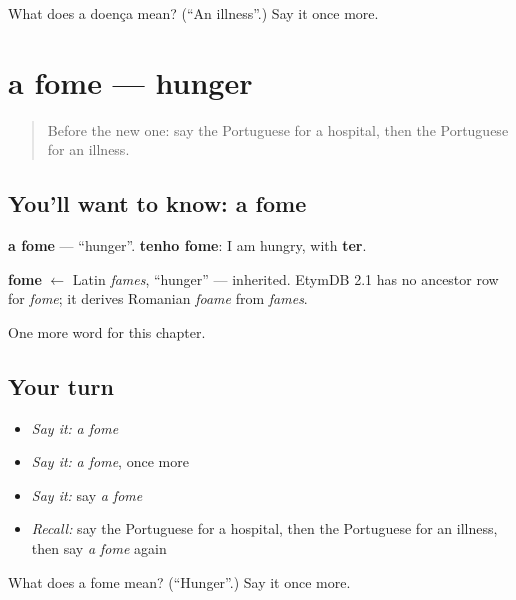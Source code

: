 \begin{tcolorbox}[breakable,colback=teal!4,colframe=teal!35!black,title={Before you move on}]
What does a doença mean? (\textquotedblleft{}An illness\textquotedblright{}.) Say it once more.
\end{tcolorbox}
\section[a fome]{a fome — hunger}

\label{lesson:PT-C35-fome}



\begin{quote}
Before the new one: say the Portuguese for a hospital, then the Portuguese for an illness.
\end{quote}

\subsection*{You'll want to know: a fome}
\textbf{a fome} — \textquotedblleft{}hunger\textquotedblright{}. \textbf{tenho fome}: I am hungry, with \textbf{ter}.

\begin{cousinweb}
\textbf{fome} $\leftarrow$ Latin \emph{fames}, \textquotedblleft{}hunger\textquotedblright{} — inherited. EtymDB 2.1 has no ancestor row for \emph{fome}; it derives Romanian \emph{foame} from \emph{fames}.
\end{cousinweb}

\begin{grammarlens}[title={What you've built}]
One more word for this chapter.
\end{grammarlens}

\subsection*{Your turn}
\begin{itemize}
\raggedright
  \item \emph{Say it:} \emph{a fome}
  \item \emph{Say it:} \emph{a fome}, once more
  \item \emph{Say it:} say \emph{a fome}
  \item \emph{Recall:} say the Portuguese for a hospital, then the Portuguese for an illness, then say \emph{a fome} again
\end{itemize}

\begin{tcolorbox}[breakable,colback=teal!4,colframe=teal!35!black,title={Before you move on}]
What does a fome mean? (\textquotedblleft{}Hunger\textquotedblright{}.) Say it once more.
\end{tcolorbox}
